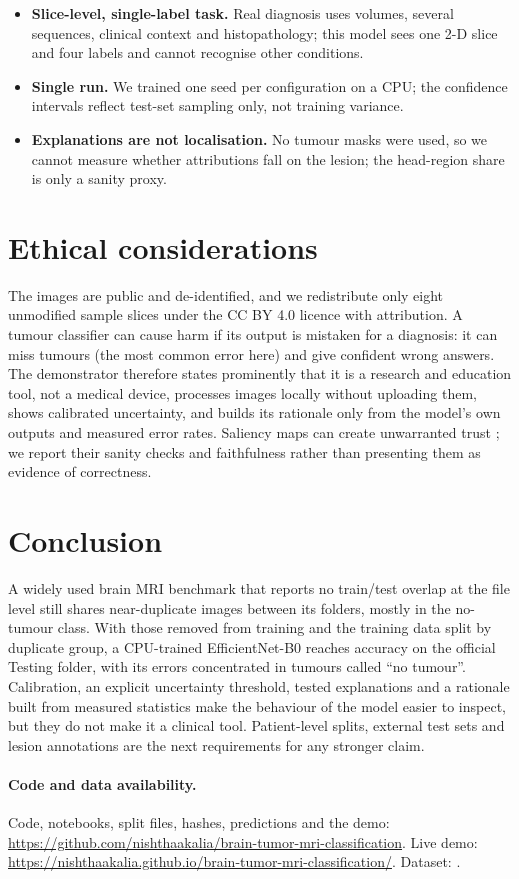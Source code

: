 \documentclass[11pt,a4paper]{article}
\begin{document}
\begin{itemize}
\item \textbf{Slice-level, single-label task.} Real diagnosis uses volumes, several sequences, clinical context and histopathology; this model sees one 2-D slice and four labels and cannot recognise other conditions.
\item \textbf{Single run.} We trained one seed per configuration on a CPU; the confidence intervals reflect test-set sampling only, not training variance.
\item \textbf{Explanations are not localisation.} No tumour masks were used, so we cannot measure whether attributions fall on the lesion; the head-region share is only a sanity proxy.
\end{itemize}

\section{Ethical considerations}
The images are public and de-identified, and we redistribute only eight unmodified sample slices under the CC BY 4.0 licence with attribution. A tumour classifier can cause harm if its output is mistaken for a diagnosis: it can miss tumours (the most common error here) and give confident wrong answers. The demonstrator therefore states prominently that it is a research and education tool, not a medical device, processes images locally without uploading them, shows calibrated uncertainty, and builds its rationale only from the model's own outputs and measured error rates. Saliency maps can create unwarranted trust \citep{adebayo2018,arun2021}; we report their sanity checks and faithfulness rather than presenting them as evidence of correctness.

\section{Conclusion}
A widely used brain MRI benchmark that reports no train/test overlap at the file level still shares near-duplicate images between its folders, mostly in the no-tumour class. With those removed from training and the training data split by duplicate group, a CPU-trained EfficientNet-B0 reaches \AccCFull{} accuracy on the official Testing folder, with its errors concentrated in tumours called ``no tumour''. Calibration, an explicit uncertainty threshold, tested explanations and a rationale built from measured statistics make the behaviour of the model easier to inspect, but they do not make it a clinical tool. Patient-level splits, external test sets and lesion annotations are the next requirements for any stronger claim.

\paragraph{Code and data availability.} Code, notebooks, split files, hashes, predictions and the demo: \url{https://github.com/nishthaakalia/brain-tumor-mri-classification}. Live demo: \url{https://nishthaakalia.github.io/brain-tumor-mri-classification/}. Dataset: \citet{nickparvar2021}.



\end{document}

